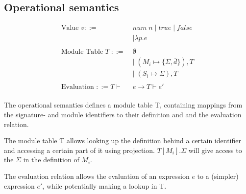 \documentclass[10pt,a4paper]{report}
\begin{document}

\subsection{Operational semantics}
\begin{align*}
\text{Value }v ::=\;&\mathit{num\;n} \; | \; \mathit{true} \; | \; \mathit{false} \\
&| \lambda p.e\\
\\
\text{Module Table } T\; ::= \;&\emptyset \\
&| \; (M_{i} \mapsto \lbrace \Sigma,\overline{d}\rbrace), T \\
&| \; (S_{i} \mapsto \Sigma), T\\
\\
\text{Evaluation } ::= T \vdash &e \rightarrow T \vdash e' \\
\end{align*}

The operational semantics defines a module table T, containing mappings from the signature-%
and module identifiers to their definition and and the evaluation relation. 

The module table T allows looking up the definition behind a certain identifier and accessing a certain part of it using projection. $T[M_{i}].\Sigma$ will give access to the $\Sigma$ in the definition of $M_{i}$. 

The evaluation relation allows the evaluation of an expression $e$ to a (simpler) expression $e'$, while potentially making a lookup in T.
\end{document}
